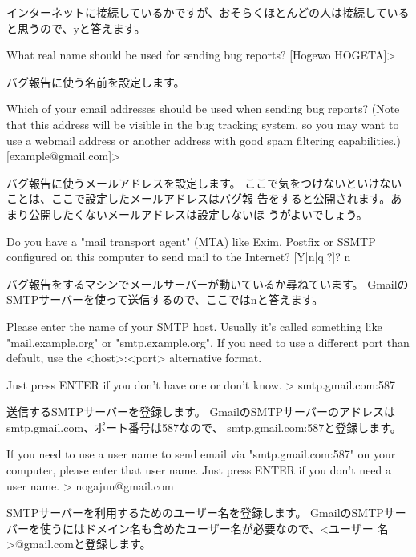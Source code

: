\documentclass[mingoth,a4paper]{jsarticle}
\begin{document}
インターネットに接続しているかですが、おそらくほとんどの人は接続している
と思うので、yと答えます。

\begin{commandline}
What real name should be used for sending bug reports?
[Hogewo HOGETA]>
\end{commandline}

バグ報告に使う名前を設定します。

\begin{commandline}
Which of your email addresses should be used when sending bug reports? (Note that this address will be visible in the bug
tracking system, so you may want to use a webmail address or another address with good spam filtering capabilities.)
[example@gmail.com]>
\end{commandline}

バグ報告に使うメールアドレスを設定します。
ここで気をつけないといけないことは、ここで設定したメールアドレスはバグ報
告をすると公開されます。あまり公開したくないメールアドレスは設定しないほ
うがよいでしょう。

\begin{commandline}
Do you have a "mail transport agent" (MTA) like Exim, Postfix or SSMTP configured on this computer to send mail to the
Internet? [Y|n|q|?]? n
\end{commandline}

バグ報告をするマシンでメールサーバーが動いているか尋ねています。
GmailのSMTPサーバーを使って送信するので、ここではnと答えます。

\begin{commandline}
Please enter the name of your SMTP host.  Usually it's called something
 like "mail.example.org" or "smtp.example.org".
If you need to use a different port than default, use the <host>:<port> alternative format.

Just press ENTER if you don't have one or don't know.
> smtp.gmail.com:587
\end{commandline}

送信するSMTPサーバーを登録します。
GmailのSMTPサーバーのアドレスはsmtp.gmail.com、ポート番号は587なので、
smtp.gmail.com:587と登録します。

\begin{commandline}
If you need to use a user name to send email via "smtp.gmail.com:587" on your computer, please enter that user name. Just
press ENTER if you don't need a user name.
> nogajun@gmail.com
\end{commandline}

SMTPサーバーを利用するためのユーザー名を登録します。
GmailのSMTPサーバーを使うにはドメイン名も含めたユーザー名が必要なので、<ユーザー
名>@gmail.comと登録します。
\end{document}
